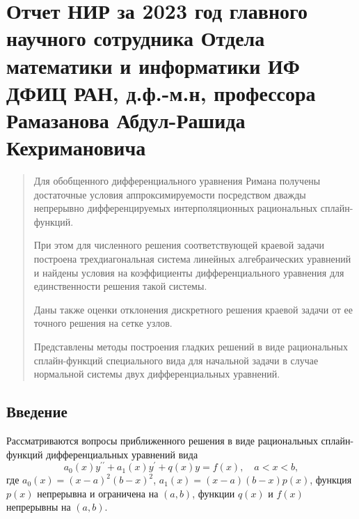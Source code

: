 

  \chapter{Отчет НИР за 2023 год  главного научного  сотрудника  Отдела математики  и информатики 
ИФ ДФИЦ РАН, д.ф.-м.н, профессора Рамазанова  Абдул-Рашида  Кехримановича}






\begin{abstract}

Для обобщенного дифференциального уравнения Римана получены 
 достаточные условия аппроксимируемости посредством дважды непрерывно
 дифференцируемых интерполяционных рациональных сплайн-функций. 

При этом для численного решения соответствующей краевой задачи 
построена трехдиагональная система линейных алгебраических уравнений 
и найдены условия на коэффициенты дифференциального уравнения для 
единственности решения такой системы. 

Даны также оценки отклонения дискретного решения краевой 
задачи от ее точного решения на сетке узлов. 

Представлены методы построения гладких решений в виде рациональных сплайн-функций 
специального вида для начальной задачи в случае нормальной системы двух 
дифференциальных уравнений.

\end{abstract}

\section*{Введение}

Рассматриваются вопросы приближенного решения в виде рациональных сплайн- функций
дифференциальных уравнений вида
\begin{equation}\label{eq:ark-0.1}
a_0(x) y^{\prime\prime}+a_1(x) y^\prime+q(x) y=f(x),\quad a< x<b, 
\end{equation}
где $a_0(x)=(x-a)^2(b-x)^2$, $a_1(x)=(x-a)(b-x)p(x)$, функция $p(x)$ 
непрерывна и ограничена на $(a,b)$, функции $q(x)$ и $f(x)$ непрерывны на $(a,b)$.

